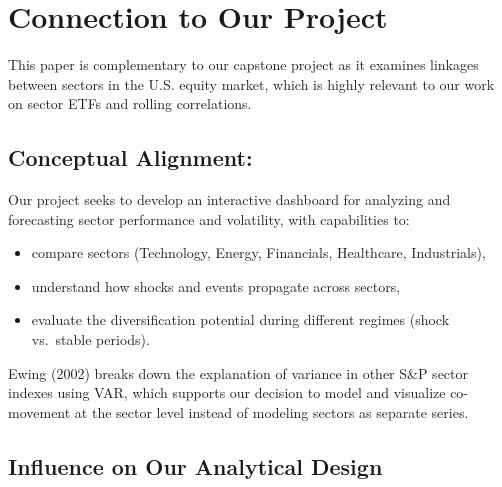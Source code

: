 \documentclass{article}
\begin{document}
\hfill

\section{Connection to Our Project}

\noindent This paper is complementary to our capstone project as it examines linkages between sectors in the U.S. equity market, which is highly relevant to our work on sector ETFs and rolling correlations.

\subsection{Conceptual Alignment:}  
Our project seeks to develop an interactive dashboard for analyzing and forecasting sector performance and volatility, with capabilities to:

\begin{itemize}
    \item compare sectors (Technology, Energy, Financials, Healthcare, Industrials), 
    \item understand how shocks and events propagate across sectors,
    \item evaluate the diversification potential during different regimes (shock vs.\ stable periods).
\end{itemize}

\noindent Ewing (2002) breaks down the explanation of variance in other S\&P sector indexes using VAR, which supports our decision to model and visualize co-movement at the sector level instead of modeling sectors as separate series.


\subsection{Influence on Our Analytical Design}
\end{document}
